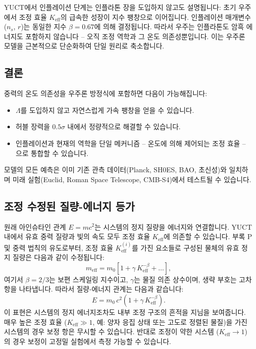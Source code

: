 \documentclass[11pt,a4paper]{article}
\newcommand{\Keff}{K_{\mathrm{eff}}}
\begin{document}
	YUCT에서 인플레이션 단계는 인플라톤 장을 도입하지 않고도 설명됩니다: 초기 우주에서 조정 효율 $\Keff$의 급속한 성장이 지수 팽창으로 이어집니다. 인플레이션 매개변수($n_s$, $r$)는 동일한 지수 $\beta = 0.67$에 의해 결정됩니다. 따라서 우주는 인플라톤도 암흑 에너지도 포함하지 않습니다 – 오직 조정 역학과 그 온도 의존성뿐입니다. 이는 우주론 모델을 근본적으로 단순화하여 단일 원리로 축소합니다.
	
	\subsection{결론}
	
	중력의 온도 의존성을 우주론 방정식에 포함하면 다음이 가능해집니다:
	\begin{itemize}
		\item $\Lambda$를 도입하지 않고 자연스럽게 가속 팽창을 얻을 수 있습니다.
		\item 허블 장력을 $0.5\sigma$ 내에서 정량적으로 해결할 수 있습니다.
		\item 인플레이션과 현재의 역학을 단일 메커니즘 – 온도에 의해 제어되는 조정 효율 – 으로 통합할 수 있습니다.
	\end{itemize}
	모델의 모든 예측은 이미 기존 관측 데이터(Planck, SH0ES, BAO, 초신성)와 일치하며 미래 실험(Euclid, Roman Space Telescope, CMB-S4)에서 테스트될 수 있습니다.
	
	
	\subsection{조정 수정된 질량-에너지 등가}
	\label{subsec:coord-emc2}
	
	원래 아인슈타인 관계 $E = m c^{2}$는 시스템의 정지 질량을 에너지와 연결합니다. YUCT 내에서 유효 중력 질량과 빛의 속도 모두 조정 효율 $K_{\mathrm{eff}}$에 의존할 수 있습니다. 부록 P 및 중력 법칙의 유도로부터, 조정 효율 $K_{\mathrm{eff}}^{(i)}$를 가진 요소들로 구성된 물체의 유효 정지 질량은 다음과 같이 수정됩니다:
	\[
	m_{\mathrm{eff}} = m_{0} \left[ 1 + \gamma \, K_{\mathrm{eff}}^{-\beta} + \dots \right],
	\]
	여기서 $\beta = 2/3$는 보편 스케일링 지수이고, $\gamma$는 물질 의존 상수이며, 생략 부호는 고차 항을 나타냅니다. 따라서 질량-에너지 관계는 다음과 같습니다:
	\[
	\boxed{E = m_{0} \, c^{2} \left( 1 + \gamma \, K_{\mathrm{eff}}^{-\beta} \right)}.
	\]
	이 표현은 시스템의 정지 에너지조차도 내부 조정 구조의 흔적을 지님을 보여줍니다. 매우 높은 조정 효율 (\(K_{\mathrm{eff}} \gg 1\), 예: 양자 응집 상태 또는 고도로 정렬된 물질)을 가진 시스템의 경우 보정 항은 무시할 수 있습니다. 반대로 조정이 약한 시스템 ($K_{\mathrm{eff}} \to 1$)의 경우 보정이 고정밀 실험에서 측정 가능할 수 있습니다.
	
\end{document}
